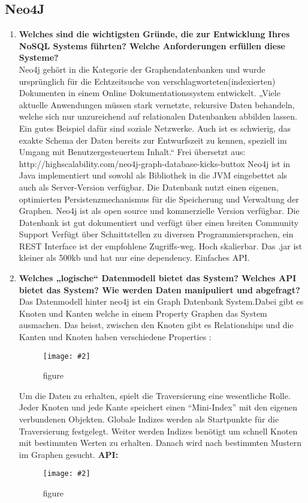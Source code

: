 \documentclass[a4paper,10pt,titlepage=false]{scrreprt}
\newcommand{\pic}[2][figure]{\begin{figure}[h]
 \centering
 \texttt{[image: \#2]}
 \caption{#1}
\end{figure}
}
\begin{document}
\begin{itemize}
\section{Neo4J} %
\label{sec:neo4j}
\begin{enumerate}
  \item \textbf{Welches sind die wichtigsten Gründe, die zur Entwicklung Ihres NoSQL Systems führten? Welche Anforderungen erfüllen diese Systeme?}\\
  Neo4j gehört in die Kategorie der Graphendatenbanken und wurde ursprünglich für die Echtzeitsuche von verschlagworteten(indexierten) Dokumenten in einem Online Dokumentationssystem entwickelt.
„Viele aktuelle Anwendungen müssen stark vernetzte, rekursive Daten behandeln, welche sich nur unzureichend auf relationalen Datenbanken abbilden lassen. Ein gutes Beispiel dafür sind soziale Netzwerke. Auch ist es schwierig, das exakte Schema der Daten bereits zur Entwurfszeit zu kennen, speziell im Umgang mit Benutzergesteuertem Inhalt.“
Frei übersetzt aus: http://highscalability.com/neo4j-graph-database-kicks-buttox
Neo4j ist in Java implementiert und sowohl als Bibliothek in die JVM eingebettet als auch als Server-Version verfügbar. Die Datenbank nutzt einen eigenen, optimierten Persistenzmechanismus für die Speicherung und Verwaltung der Graphen.
Neo4j ist als open source und kommerzielle Version verfügbar.
Die Datenbank ist gut dokumentiert und verfügt über einen breiten Community Support
Verfügt über Schnittstellen zu diversen Programmiersprachen, ein REST Interface ist der empfohlene Zugriffs-weg.
Hoch skalierbar.
Das .jar ist kleiner als 500kb und hat nur eine dependency.
Einfaches API.
\item \textbf{Welches „logische“ Datenmodell bietet das System? Welches API bietet das System? Wie werden Daten manipuliert und abgefragt?}\\
Das Datenmodell hinter neo4j ist ein Graph Datenbank System.Dabei gibt es Knoten und Kanten welche in einem Property Graphen das System ausmachen. Das heisst, zwischen den Knoten gibt es Relationships und die Kanten und Knoten haben verschiedene Properties :
\pic{n4jkk.png}
Um die Daten zu erhalten, spielt die Traversierung eine wesentliche Rolle. Jeder Knoten und jede Kante speichert einen “Mini-Index” mit den eigenen verbundenen Objekten. Globale Indizes werden als Startpunkte für die Traversierung festgelegt. Weiter werden Indizes benötigt um schnell Knoten mit bestimmten Werten zu erhalten. Danach wird nach bestimmten Mustern im Graphen gesucht.\newpage
\textbf{API:}  \pic{n4japi.png} 

\end{enumerate}
\end{itemize}
\end{document}
